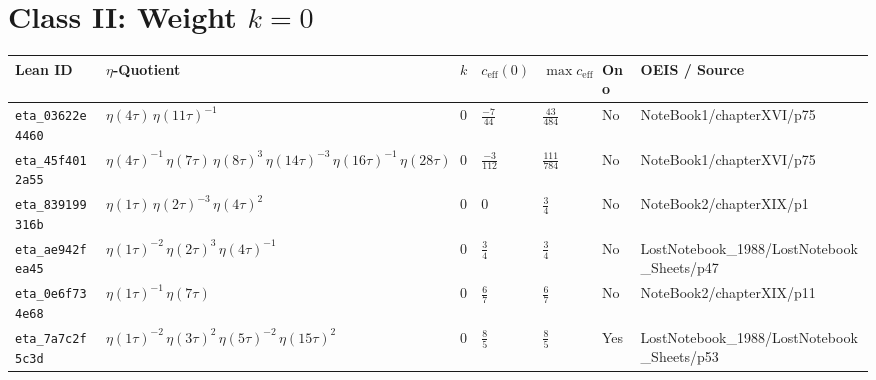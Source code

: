\documentclass[11pt,twoside,openright]{book}
\begin{document}
\section{Class II: Weight $k = 0$}
\begin{longtable}{p{2.3cm}p{4.3cm}llllp{2.3cm}}
\toprule
\textbf{Lean ID} & \textbf{$\eta$-Quotient} & $k$ & $c_{\text{eff}}(0)$ & $\max c_{\text{eff}}$ & \textbf{Ono} & \textbf{OEIS / Source} \\
\midrule
\endhead
\texttt{eta\_03622e4460} & $\eta(4\tau)\, \eta(11\tau)^{-1}$ & $0$ & $\frac{-7}{44}$ & $\frac{43}{484}$ & No & NoteBook1/chapterXVI/p75 \\
\texttt{eta\_45f4012a55} & $\eta(4\tau)^{-1}\, \eta(7\tau)\, \eta(8\tau)^{3}\, \eta(14\tau)^{-3}\, \eta(16\tau)^{-1}\, \eta(28\tau)$ & $0$ & $\frac{-3}{112}$ & $\frac{111}{784}$ & No & NoteBook1/chapterXVI/p75 \\
\texttt{eta\_839199316b} & $\eta(1\tau)\, \eta(2\tau)^{-3}\, \eta(4\tau)^{2}$ & $0$ & $0$ & $\frac{3}{4}$ & No & NoteBook2/chapterXIX/p1 \\
\texttt{eta\_ae942fea45} & $\eta(1\tau)^{-2}\, \eta(2\tau)^{3}\, \eta(4\tau)^{-1}$ & $0$ & $\frac{3}{4}$ & $\frac{3}{4}$ & No & LostNotebook\_1988/LostNotebook\_Sheets/p47 \\
\texttt{eta\_0e6f734e68} & $\eta(1\tau)^{-1}\, \eta(7\tau)$ & $0$ & $\frac{6}{7}$ & $\frac{6}{7}$ & No & NoteBook2/chapterXIX/p11 \\
\texttt{eta\_7a7c2f5c3d} & $\eta(1\tau)^{-2}\, \eta(3\tau)^{2}\, \eta(5\tau)^{-2}\, \eta(15\tau)^{2}$ & $0$ & $\frac{8}{5}$ & $\frac{8}{5}$ & Yes & LostNotebook\_1988/LostNotebook\_Sheets/p53 \\
\bottomrule
\end{longtable}
\end{document}
